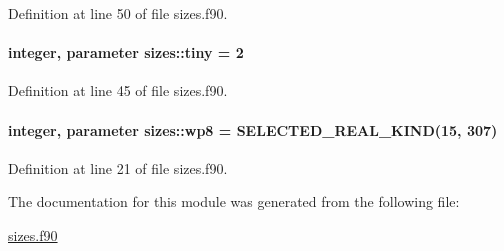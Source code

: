 Definition at line 50 of file sizes.\-f90.

\hypertarget{classsizes_ac491b592402fe8da6f0c09245628f761}{
\paragraph[{tiny}]{\setlength{\rightskip}{0pt plus 5cm}integer, parameter sizes\-::tiny = 2}}\label{classsizes_ac491b592402fe8da6f0c09245628f761}


Definition at line 45 of file sizes.\-f90.

\hypertarget{classsizes_a7f10d92edcfab4b18d1be16a1e4bde39}{
\paragraph[{wp8}]{\setlength{\rightskip}{0pt plus 5cm}integer, parameter sizes\-::wp8 = S\-E\-L\-E\-C\-T\-E\-D\-\_\-\-R\-E\-A\-L\-\_\-\-K\-I\-N\-D(15, 307)}}\label{classsizes_a7f10d92edcfab4b18d1be16a1e4bde39}


Definition at line 21 of file sizes.\-f90.



The documentation for this module was generated from the following file\-:\begin{DoxyCompactItemize}
\item 
\hyperlink{sizes_8f90}{sizes.\-f90}\end{DoxyCompactItemize}
